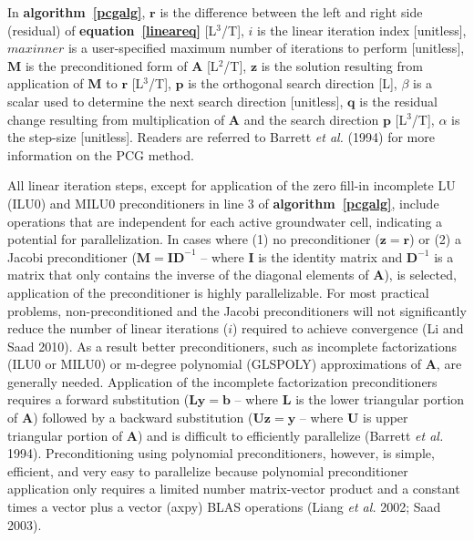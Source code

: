 \documentclass[12pt]{article}
\begin{document}
In \textbf{algorithm~\ref{pcgalg}}, $\mathbf{r}$ is the \color{cyan}difference between the left and right side (residual) \color{black}of \textbf{equation~\ref{lineareq}} [L$^3$/T], $i$ is the linear iteration index [unitless], $maxinner$ is a user-specified maximum number of iterations to perform [unitless], $\mathbf{M}$ is the preconditioned form of $\mathbf{A}$ [L$^2$/T], $\mathbf{z}$ is the solution resulting from application of $\mathbf{M}$ to $\mathbf{r}$ [L$^3$/T], $\mathbf{p}$ is the orthogonal search direction [L], $\beta$ is a scalar used to determine the next search direction [unitless], $\mathbf{q}$ is the residual change resulting from multiplication of $\mathbf{A}$ and the search direction $\mathbf{p}$ [L$^3$/T], $\alpha$ is the step-size [unitless]. \color{cyan}Readers are referred to Barrett \textit{et al.} (1994) for more information on the PCG method.\color{black}

All linear iteration steps, except for application of the zero fill-in incomplete LU (ILU0) and MILU0 preconditioners in line 3 of \textbf{algorithm~\ref{pcgalg}}, include operations that are independent for each active groundwater cell, indicating a potential for parallelization. In cases where (1) no preconditioner ($\mathbf{z = r}$) or (2) a Jacobi preconditioner ($\mathbf{M = I D}^{-1}$ -- where $\mathbf{I}$ is the identity matrix and $\mathbf{D}^{-1}$ is a matrix that only contains the inverse of the diagonal elements of $\mathbf{A}$), is selected, application of the preconditioner is highly parallelizable. For most practical problems, non-preconditioned and the Jacobi preconditioners will not significantly reduce the number of linear iterations ($i$) required to achieve convergence (Li and Saad 2010). As a result better preconditioners, such as incomplete factorizations (ILU0 or MILU0) or m-degree polynomial (GLSPOLY) approximations of $\mathbf{A}$, are generally needed. Application of the incomplete factorization preconditioners requires a forward substitution ($\mathbf{Ly = b}$ -- where $\mathbf{L}$ is the lower triangular portion of $\mathbf{A}$) followed by a backward substitution ($\mathbf{Uz = y}$ – where $\mathbf{U}$ is upper triangular portion of $\mathbf{A}$) and is difficult to efficiently parallelize (Barrett \textit{et al.} 1994). Preconditioning using polynomial preconditioners, however, is simple, efficient, and very easy to parallelize \color{cyan}because polynomial preconditioner application only requires a limited number matrix-vector product and a constant times a vector plus a vector (axpy) BLAS operations \color{black} (Liang \textit{et al.} 2002; Saad 2003).
\end{document}
